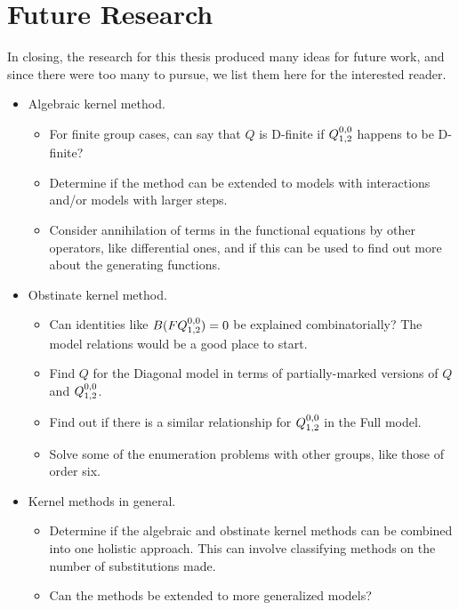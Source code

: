 \section{Future Research}

In closing, the research for this thesis produced many ideas for future work, and since there were too many to pursue, we list them here for the interested reader.
\begin{itemize}
\item Algebraic kernel method.
\begin{itemize}
	\item For finite group cases, can say that $Q$ is D-finite if $Q_{1,2}^{0,0}$ happens to be D-finite?
	\item Determine if the method can be extended to \highD models with interactions and/or models with larger steps.
	\item Consider annihilation of terms in the functional equations by other operators, like differential ones, and if this can be used to find out more about the generating functions.
\end{itemize}

\item Obstinate kernel method.
\begin{itemize}
	\item Can identities like $B(FQ_{1,2}^{0,0}) = 0$ be explained combinatorially? The \oneD model relations would be a good place to start.
	\item Find $Q$ for the Diagonal model in terms of partially-marked versions of $Q$ and $Q_{1,2}^{0,0}$.
	\item Find out if there is a similar relationship for $Q_{1,2}^{0,0}$ in the Full model.
	\item Solve some of the enumeration problems with other groups, like those of order six.
\end{itemize}

\item Kernel methods in general.
\begin{itemize}
	\item Determine if the algebraic and obstinate kernel methods can be combined into one holistic approach. This can involve classifying methods on the number of substitutions made.
	\item Can the methods be extended to more generalized models?
\end{itemize}


\end{itemize}
